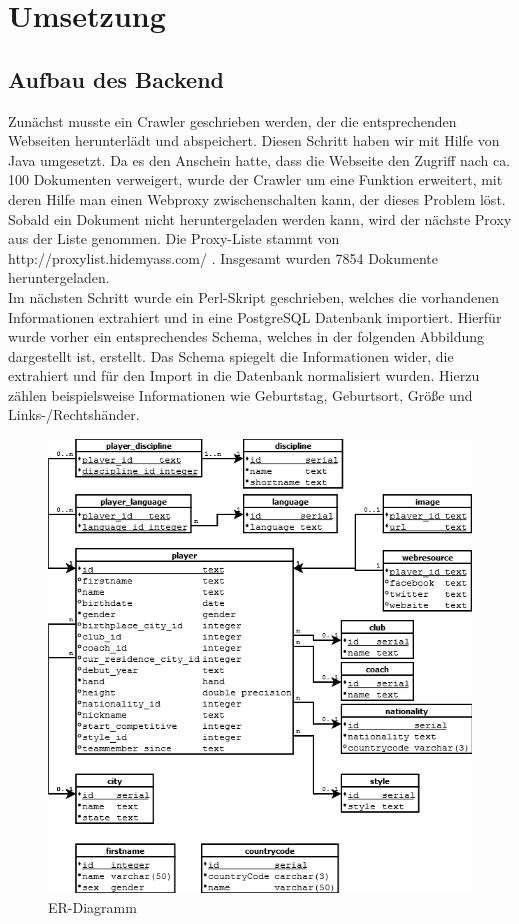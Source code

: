 \documentclass[12pt,a4paper]{scrreprt}
\begin{document}
\chapter{Umsetzung}
\section{Aufbau des Backend}
\label{Backend}
Zunächst musste ein Crawler geschrieben werden, der die entsprechenden Webseiten herunterlädt und abspeichert. Diesen Schritt haben wir mit Hilfe von Java umgesetzt. Da es den Anschein hatte, dass die Webseite den Zugriff nach ca. 100 Dokumenten verweigert, wurde der Crawler um eine Funktion erweitert, mit deren Hilfe man einen Webproxy zwischenschalten kann, der dieses Problem löst. Sobald ein Dokument nicht heruntergeladen werden kann, wird der nächste Proxy aus der Liste genommen. Die Proxy-Liste stammt von http://proxylist.hidemyass.com/ \cite{HMA2015}. Insgesamt wurden 7854 Dokumente heruntergeladen.\\

Im nächsten Schritt wurde ein Perl-Skript geschrieben, welches die vorhandenen Informationen extrahiert und in eine PostgreSQL Datenbank importiert. Hierfür wurde vorher ein entsprechendes Schema, welches in der folgenden Abbildung dargestellt ist, erstellt. Das Schema spiegelt die Informationen wider, die extrahiert und für den Import in die Datenbank normalisiert wurden. Hierzu zählen beispielsweise Informationen wie Geburtstag, Geburtsort, Größe und Links-/Rechtshänder.

\begin{figure}[H]
\centering
\includegraphics[width=1\textwidth] {ER-Diagramm} 
\caption{ER-Diagramm}
\label{fig:ER-Diagramm}
\end{figure}
\end{document}
